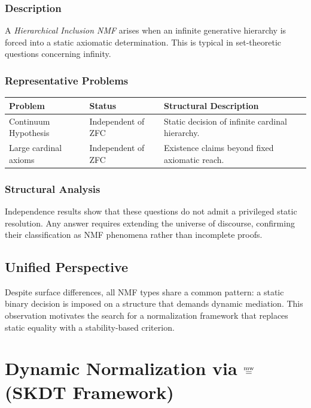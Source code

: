 \documentclass[11pt]{article}
\begin{document}
\subsubsection{Description}

A \emph{Hierarchical Inclusion NMF} arises when an infinite generative
hierarchy is forced into a static axiomatic determination.
This is typical in set-theoretic questions concerning infinity.

\subsubsection{Representative Problems}

\begin{center}
\begin{tabular}{|l|l|p{7cm}|}
\hline
Problem & Status & Structural Description \\
\hline
Continuum Hypothesis & Independent of ZFC &
Static decision of infinite cardinal hierarchy. \\
\hline
Large cardinal axioms & Independent of ZFC &
Existence claims beyond fixed axiomatic reach. \\
\hline
\end{tabular}
\end{center}

\subsubsection{Structural Analysis}

Independence results show that these questions do not admit a
privileged static resolution.
Any answer requires extending the universe of discourse, confirming
their classification as NMF phenomena rather than incomplete proofs.

\subsection{Unified Perspective}

Despite surface differences, all NMF types share a common pattern:
a static binary decision is imposed on a structure that demands
dynamic mediation.
This observation motivates the search for a normalization framework
that replaces static equality with a stability-based criterion.



\section{Dynamic Normalization via $\mathrel{\overset{\mathrm{mw}}{=}}$ (SKDT Framework)}
\end{document}
